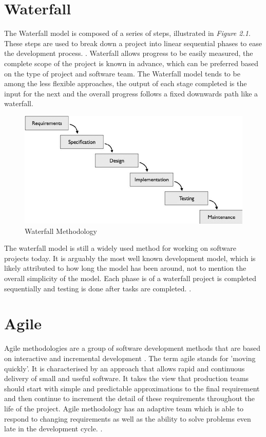 \section{Waterfall}
The Waterfall model is composed of a series of steps, illustrated in \emph{Figure 2.1}. These steps are used to break down a project into linear sequential phases to ease the development process.  \cite{petersen2009waterfall}. Waterfall allows progress to be easily measured, the complete scope of the project is known in advance, which can be preferred based on the type of project and software team. The Waterfall model tends to be among the less flexible approaches, the output of each stage completed is the input for the next and the overall progress follows a fixed downwards path like a waterfall.
\begin{figure}[ht]
    \centering
    \includegraphics[scale=0.46]{img/Waterfall.png}
    \caption{Waterfall Methodology}
    \label{fig:my_label1}
\end{figure}
The waterfall model is still a widely used method for working on software projects today. It is arguably the most well known development model, which is likely attributed to how long the model has been around, not to mention the overall simplicity of the model. Each phase is of a waterfall project is completed sequentially and testing is done after tasks are completed. \cite{balaji2012waterfall}.

\section{Agile}
Agile methodologies are a group of software development methods that are based on interactive and incremental development \cite{kumar2012impact}. The term agile stands for 'moving quickly'. It is characterised by an approach that allows rapid and continuous delivery of small and useful software. It takes the view  that production teams should start with simple and predictable approximations to the final requirement and then continue to increment the detail of these requirements throughout the life of the project. Agile methodology has an adaptive team which is able to respond to changing requirements as well as the ability to solve problems even late in the development cycle. \cite{balaji2012waterfall}.

